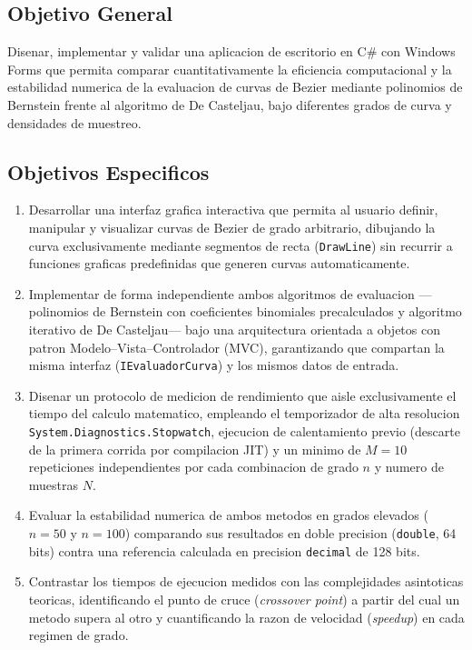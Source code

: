 \subsection{Objetivo General}
\label{subsec:intro_objetivo_general}

Disenar, implementar y validar una aplicacion de escritorio en C\# con Windows Forms que permita comparar cuantitativamente la eficiencia computacional y la estabilidad numerica de la evaluacion de curvas de Bezier mediante polinomios de Bernstein frente al algoritmo de De Casteljau, bajo diferentes grados de curva y densidades de muestreo.

\subsection{Objetivos Especificos}
\label{subsec:intro_objetivos_especificos}

\begin{enumerate}
    \item Desarrollar una interfaz grafica interactiva que permita al usuario definir, manipular y visualizar curvas de Bezier de grado arbitrario, dibujando la curva exclusivamente mediante segmentos de recta (\texttt{DrawLine}) sin recurrir a funciones graficas predefinidas que generen curvas automaticamente.
    \item Implementar de forma independiente ambos algoritmos de evaluacion ---polinomios de Bernstein con coeficientes binomiales precalculados y algoritmo iterativo de De Casteljau--- bajo una arquitectura orientada a objetos con patron Modelo--Vista--Controlador (MVC), garantizando que compartan la misma interfaz (\texttt{IEvaluadorCurva}) y los mismos datos de entrada.
    \item Disenar un protocolo de medicion de rendimiento que aisle exclusivamente el tiempo del calculo matematico, empleando el temporizador de alta resolucion \texttt{System.Diagnostics.Stopwatch}, ejecucion de calentamiento previo (descarte de la primera corrida por compilacion JIT) y un minimo de $M = 10$ repeticiones independientes por cada combinacion de grado $n$ y numero de muestras $N$.
    \item Evaluar la estabilidad numerica de ambos metodos en grados elevados ($n = 50$ y $n = 100$) comparando sus resultados en doble precision (\texttt{double}, 64 bits) contra una referencia calculada en precision \texttt{decimal} de 128 bits.
    \item Contrastar los tiempos de ejecucion medidos con las complejidades asintoticas teoricas, identificando el punto de cruce (\textit{crossover point}) a partir del cual un metodo supera al otro y cuantificando la razon de velocidad (\textit{speedup}) en cada regimen de grado.
\end{enumerate}

